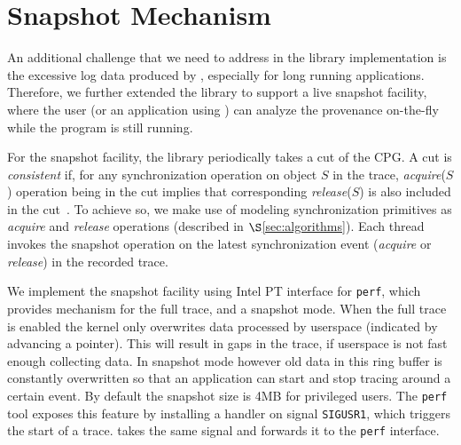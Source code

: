 \section{Snapshot Mechanism}
\label{sec:snapshot}
An additional challenge that we need to address in the library implementation is the excessive log data produced by \intelpt, especially for long running applications. Therefore, we further extended the library to support a live snapshot facility, where the user (or an application using \projecttitle) can analyze the provenance on-the-fly while the program is still running.

For the snapshot facility, the library periodically takes a cut of the CPG. A cut is {\em consistent} if, for any synchronization operation on object $S$ in the trace,  {\em acquire}($S$) operation being in the cut implies that corresponding {\em release}($S$) is also included in the cut~\cite{chandy-lamport}.  To achieve so, we make use of modeling synchronization primitives as {\em acquire} and {\em release} operations (described in $\S$\ref{sec:algorithms}). Each thread invokes the snapshot operation on the latest synchronization event ({\em acquire} or {\em release}) in the recorded trace.

We implement the snapshot facility using Intel PT interface for {\tt perf},
which provides mechanism for the full trace, and a snapshot mode.
When the full trace is enabled the kernel only overwrites data processed by
userspace (indicated by advancing a pointer). This will result in gaps in the
trace, if userspace is not fast enough collecting data. In snapshot mode however
old data in this ring buffer is constantly overwritten so that an application
can start and stop tracing around a certain event. By default the snapshot size is 4MB for
privileged users. The {\tt perf} tool exposes this feature by installing a handler on
signal {\tt SIGUSR1}, which triggers the start of a trace. \projecttitle takes the same signal
and forwards it to the {\tt perf} interface.
